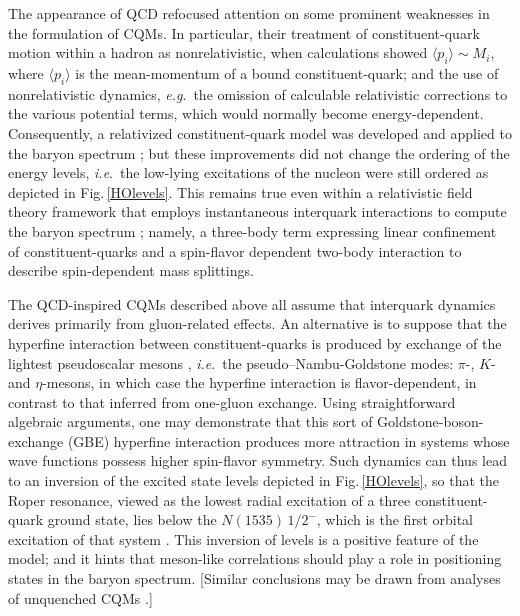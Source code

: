 The appearance of QCD refocused attention on some prominent weaknesses in the formulation of CQMs.  In particular, their treatment of constituent-quark motion within a hadron as nonrelativistic, when calculations showed $\langle p_i \rangle \sim M_i$, where $\langle p_i\rangle$ is the mean-momentum of a bound constituent-quark; and the use of nonrelativistic dynamics, \emph{e.g}.\ the omission of calculable relativistic corrections to the various potential terms, which would normally become energy-dependent.  Consequently, a relativized constituent-quark model was developed \cite{Godfrey:1985xj} and applied to the baryon spectrum \cite{Capstick:1986bm}; but these improvements did not change the ordering of the energy levels, \emph{i.e}.\ the low-lying excitations of the nucleon were still ordered as depicted in Fig.\,\ref{HOlevels}.
%
This remains true even within a relativistic field theory framework that employs instantaneous interquark interactions to compute the baryon spectrum \cite{Loring:2001kx}; namely, a three-body term expressing linear confinement of constituent-quarks and a spin-flavor dependent two-body interaction to describe spin-dependent mass splittings.

The QCD-inspired CQMs described above all assume that interquark dynamics derives primarily from gluon-related effects.  An alternative is to suppose that the hyperfine interaction between constituent-quarks is produced by exchange of the lightest pseudoscalar mesons \cite{Glozman:1995fu}, \emph{i.e}.\ the pseudo--Nambu-Goldstone modes: $\pi$-, $K$- and $\eta$-mesons, in which case the hyperfine interaction is flavor-dependent, in contrast to that inferred from one-gluon exchange.  Using straightforward algebraic arguments, one may demonstrate that this sort of Goldstone-boson-exchange (GBE) hyperfine interaction produces more attraction in systems whose wave functions possess higher spin-flavor symmetry.  Such dynamics can thus lead to an inversion of the excited state levels depicted in Fig.\,\ref{HOlevels}, so that the Roper resonance, viewed as the lowest radial excitation of a three constituent-quark ground state, lies below the $N(1535)\,1/2^-$, which is the first orbital excitation of that system \cite{Yang:2017}.  This inversion of levels is a positive feature of the model; and it hints that meson-like correlations should play a role in positioning states in the baryon spectrum.  [Similar conclusions may be drawn from analyses of unquenched CQMs \cite{JuliaDiaz:2006av}.]

